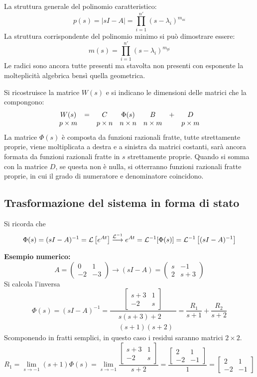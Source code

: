 La struttura generale del polinomio caratteristico:
$$
p(s) = |sI-A| = \prod_{i=1}^{n'}(s-\lambda_i)^{m_{ai}}
$$
La struttura corrispondente del polinomio minimo si può dimostrare essere:
$$
m(s) = \prod_{i=1}^{n'} (s-\lambda_i)^{m_{gi}}
$$
Le radici sono ancora tutte presenti ma stavolta non presenti con esponente la
molteplicità algebrica bensì quella geometrica.

Si ricostruisce la matrice $W(s)$ e si indicano le dimensioni delle matrici che
la compongono:
$$\begin{array}{c c c c c c c}
W(s) &= &C&\Phi(s)&B &+ &D\\
p\times m & & p\times n& n \times n & n \times m & & p \times m
\end{array}$$
La matrice $\Phi(s)$ è composta da funzioni razionali fratte, tutte
strettamente proprie, viene moltiplicata a destra e a sinistra da matrici
costanti, sarà ancora formata da funzioni razionali fratte in $s$ strettamente
proprie. Quando si somma con la matrice $D$, se questa non è nulla, si
otterranno funzioni razionali fratte proprie, in cui il grado di numeratore e
denominatore coincidono.

\subsection{Trasformazione del sistema in forma di stato}
Si ricorda che
$$
\Phi(s) = (sI-A)^{-1} = \mathcal{L}\left[e^{At}\right]
\stackrel{\mathcal{L}^{-1}}{\longrightarrow}  e^{At} = \mathcal{L}^{-1}[\Phi(s)] =
\mathcal{L}^{-1}\left[(sI-A)^{-1}\right]
$$

\textbf{Esempio numerico:}
$$
A = \begin{pmatrix}
     0 & 1 \\ -2 & -3
    \end{pmatrix}
\longrightarrow (sI-A) =
\begin{pmatrix}
 s & -1 \\ 2 & s+3
\end{pmatrix}
$$
Si calcola l'inversa
$$
\Phi(s) = (sI-A)^{-1} = \frac{
\begin{bmatrix}
  s+3 & 1 \\ -2 & s
  \end{bmatrix}
}{\begin{aligned}
&s(s+3)+2\\
&(s+1)(s+2)
  \end{aligned}
} =
\frac{R_1}{s+1} + \frac{R_2}{s+2}
$$
Scomponendo in fratti semplici, in questo caso i residui saranno matrici
$2\times 2$.
$$
R_1 = \lim_{s\to -1} (s+1) \Phi(s) = \lim_{s\to -1} \frac{
\begin{bmatrix}
 s+3 & 1 \\ -2 & s
\end{bmatrix}
}{s+2} =
\frac{
\begin{bmatrix}
 2 & 1 \\ -2 & -1
\end{bmatrix}
}{1} = \begin{bmatrix}
 2 & 1 \\ -2 & -1
\end{bmatrix}
$$

